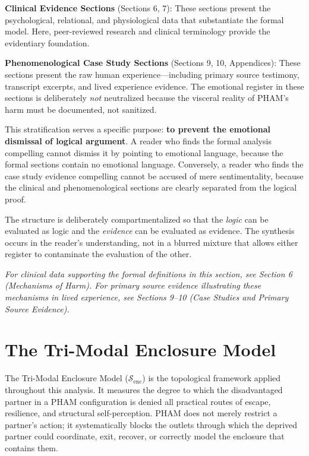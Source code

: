 \documentclass[12pt,openany]{book}
\numberwithin{equation}{chapter}
\begin{document}
\textbf{Clinical Evidence Sections} (Sections 6, 7): These sections present the psychological, relational, and physiological data that substantiate the formal model. Here, peer-reviewed research and clinical terminology provide the evidentiary foundation.

\textbf{Phenomenological Case Study Sections} (Sections 9, 10, Appendices): These sections present the raw human experience---including primary source testimony, transcript excerpts, and lived experience evidence. The emotional register in these sections is deliberately \textit{not} neutralized because the visceral reality of PHAM's harm must be documented, not sanitized.

This stratification serves a specific purpose: \textbf{to prevent the emotional dismissal of logical argument}. A reader who finds the formal analysis compelling cannot dismiss it by pointing to emotional language, because the formal sections contain no emotional language. Conversely, a reader who finds the case study evidence compelling cannot be accused of mere sentimentality, because the clinical and phenomenological sections are clearly separated from the logical proof.

The structure is deliberately compartmentalized so that the \textit{logic} can be evaluated as logic and the \textit{evidence} can be evaluated as evidence. The synthesis occurs in the reader's understanding, not in a blurred mixture that allows either register to contaminate the evaluation of the other.

\textit{For clinical data supporting the formal definitions in this section, see Section 6 (Mechanisms of Harm). For primary source evidence illustrating these mechanisms in lived experience, see Sections 9--10 (Case Studies and Primary Source Evidence).}

\chapter{The Tri-Modal Enclosure Model}
\label{ch:trimodal}

The Tri-Modal Enclosure Model ($\mathcal{S}_{\text{enc}}$) is the topological
framework applied throughout this analysis. It measures the degree to which the
disadvantaged partner in a PHAM configuration is denied all practical routes of
escape, resilience, and structural self-perception. PHAM does not merely restrict
a partner's action; it systematically blocks the outlets through which the deprived
partner could coordinate, exit, recover, or correctly model the enclosure that
contains them.
\end{document}
